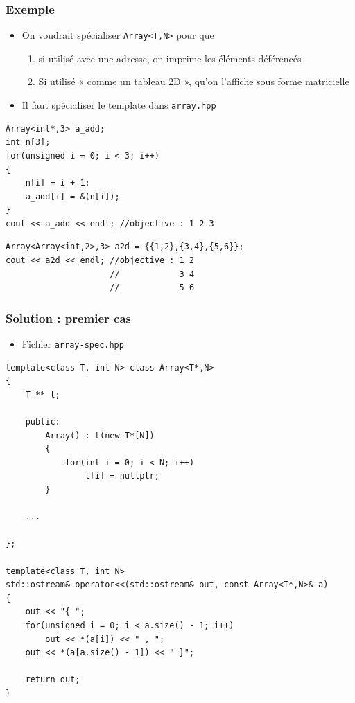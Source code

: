 \begin{frame}[containsverbatim]
\frametitle{Exemple}
\begin{itemize}
\item On voudrait spécialiser \texttt{Array<T,N>} pour que
	\begin{enumerate}
	\item si utilisé avec une adresse, on imprime les éléments déférencés
	\item Si utilisé « comme un tableau 2D », qu'on l'affiche sous forme matricielle
	\end{enumerate}
\item Il faut spécialiser le template dans \texttt{array.hpp}
\end{itemize}
\begin{lstlisting}
Array<int*,3> a_add;
int n[3];
for(unsigned i = 0; i < 3; i++)
{
	n[i] = i + 1;
    a_add[i] = &(n[i]);
}
cout << a_add << endl; //objective : 1 2 3
\end{lstlisting}
\begin{lstlisting}
Array<Array<int,2>,3> a2d = {{1,2},{3,4},{5,6}};
cout << a2d << endl; //objective : 1 2
                     //            3 4
                     //            5 6
\end{lstlisting}
\end{frame}

\begin{frame}[containsverbatim]
\frametitle{Solution : premier cas}
\begin{itemize}
\item Fichier \texttt{array-spec.hpp}
\end{itemize}
\begin{lstlisting}
template<class T, int N> class Array<T*,N>
{
	T ** t;       
    
	public:
		Array() : t(new T*[N]) 
        {
            for(int i = 0; i < N; i++)
                t[i] = nullptr;
        }
        
    ...
    
};

template<class T, int N>
std::ostream& operator<<(std::ostream& out, const Array<T*,N>& a)
{
    out << "{ ";
    for(unsigned i = 0; i < a.size() - 1; i++)
        out << *(a[i]) << " , ";
    out << *(a[a.size() - 1]) << " }";

    return out;
}
\end{lstlisting}
\end{frame}


